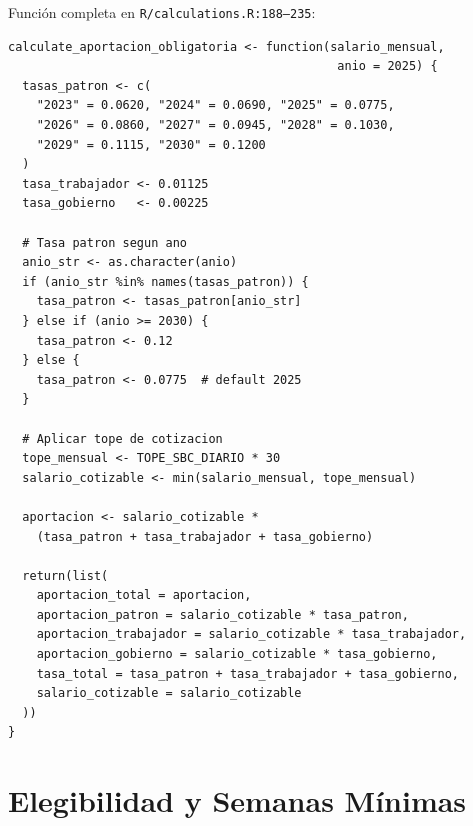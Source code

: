 \documentclass[11pt,a4paper]{report}
\begin{document}
\begin{tcolorbox}[colback=orange!5!white, colframe=orange!75!black, title=\textbf{Aplicaci\'on en C\'odigo}]
Funci\'on completa en \texttt{R/calculations.R:188--235}:

\begin{lstlisting}
calculate_aportacion_obligatoria <- function(salario_mensual,
                                              anio = 2025) {
  tasas_patron <- c(
    "2023" = 0.0620, "2024" = 0.0690, "2025" = 0.0775,
    "2026" = 0.0860, "2027" = 0.0945, "2028" = 0.1030,
    "2029" = 0.1115, "2030" = 0.1200
  )
  tasa_trabajador <- 0.01125
  tasa_gobierno   <- 0.00225

  # Tasa patron segun ano
  anio_str <- as.character(anio)
  if (anio_str %in% names(tasas_patron)) {
    tasa_patron <- tasas_patron[anio_str]
  } else if (anio >= 2030) {
    tasa_patron <- 0.12
  } else {
    tasa_patron <- 0.0775  # default 2025
  }

  # Aplicar tope de cotizacion
  tope_mensual <- TOPE_SBC_DIARIO * 30
  salario_cotizable <- min(salario_mensual, tope_mensual)

  aportacion <- salario_cotizable *
    (tasa_patron + tasa_trabajador + tasa_gobierno)

  return(list(
    aportacion_total = aportacion,
    aportacion_patron = salario_cotizable * tasa_patron,
    aportacion_trabajador = salario_cotizable * tasa_trabajador,
    aportacion_gobierno = salario_cotizable * tasa_gobierno,
    tasa_total = tasa_patron + tasa_trabajador + tasa_gobierno,
    salario_cotizable = salario_cotizable
  ))
}
\end{lstlisting}
\end{tcolorbox}

\section{Elegibilidad y Semanas M\'inimas}
\end{document}
